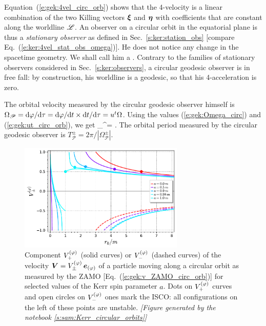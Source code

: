 Equation~(\ref{e:gek:4vel_circ_orb}) shows that the 4-velocity is a linear
combination of the two Killing vectors $\bm{\xi}$ and $\bm{\eta}$ with
coefficients that are constant along the worldline $\mathscr{L}$. An observer on
a circular orbit in the equatorial plane is thus a \emph{stationary observer} as defined in Sec.~\ref{s:ker:station_obs}
[compare Eq.~(\ref{e:ker:4vel_stat_obs_omega})]. He does not notice any change in the spacetime
geometry. We shall call him a .
Contrary to the families of stationary observers considered in Sec.~\ref{s:ker:observers},
a circular geodesic observer is in free fall: by construction, his worldline is a geodesic, so that
his 4-acceleration is zero.

The orbital velocity measured by the circular geodesic observer himself is
$\Omega_{\mathscr{P}} = \mathrm{d}\varphi / \mathrm{d}\tau = \mathrm{d}\varphi / \mathrm{d} t \times \mathrm{d} t / \mathrm{d} \tau = u^t \Omega$.
Using the values (\ref{e:gek:Omega_circ}) and (\ref{e:gek:ut_circ_orb}), we get
\be
    \Omega_{}^\pm = \pm {} .
\ee
The orbital period measured by the circular geodesic observer is
$T_{\mathscr{P}}^\pm = 2\pi / |\Omega_{\mathscr{P}}^\pm |$.


\begin{figure}
\centerline{\includegraphics[width=0.7\textwidth]{gek_v_zamo_circ_orb.pdf}}
\caption[]{\label{f:gek:v_zamo_circ_orb} \footnotesize
Component $V^{(\varphi)}_+$  (solid curves) or $V^{(\varphi)}_-$
(dashed curves) of the velocity $\bm{V} = V^{(\varphi)}_\pm \, \bm{e}_{(\varphi)}$
of a particle moving along a circular
orbit as measured by the ZAMO [Eq.~(\ref{e:gek:v_ZAMO_circ_orb})]
for selected values of the Kerr spin parameter $a$.
Dots on $V^{(\varphi)}_+$  curves and open circles on $V^{(\varphi)}_-$  ones mark the ISCO: all
configurations on the left of these points are unstable.
\textsl{[Figure generated by the notebook \ref{s:sam:Kerr_circular_orbits}]}
}
\end{figure}

